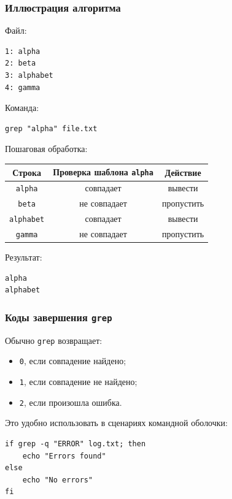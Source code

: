 \documentclass[12pt,a4paper]{article}
\begin{document}
\subsubsection{Иллюстрация алгоритма}

Файл:

\begin{verbatim}
1: alpha
2: beta
3: alphabet
4: gamma
\end{verbatim}

Команда:

\begin{verbatim}
grep "alpha" file.txt
\end{verbatim}

Пошаговая обработка:

\begin{center}
\begin{tabular}{|c|c|c|}
\hline
Строка & Проверка шаблона \texttt{alpha} & Действие \\
\hline
\texttt{alpha} & совпадает & вывести \\
\hline
\texttt{beta} & не совпадает & пропустить \\
\hline
\texttt{alphabet} & совпадает & вывести \\
\hline
\texttt{gamma} & не совпадает & пропустить \\
\hline
\end{tabular}
\end{center}

Результат:

\begin{verbatim}
alpha
alphabet
\end{verbatim}

\subsubsection{Коды завершения \texttt{grep}}

Обычно \texttt{grep} возвращает:

\begin{itemize}
    \item \texttt{0}, если совпадение найдено;
    \item \texttt{1}, если совпадение не найдено;
    \item \texttt{2}, если произошла ошибка.
\end{itemize}

Это удобно использовать в сценариях командной оболочки:

\begin{verbatim}
if grep -q "ERROR" log.txt; then
    echo "Errors found"
else
    echo "No errors"
fi
\end{verbatim}
\end{document}
